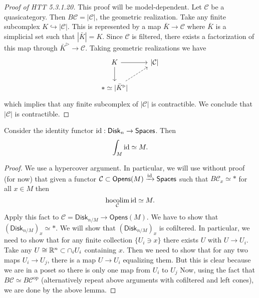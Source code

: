 \documentclass{amsart}
\DeclareMathOperator{\hocolim}{hocolim}
\newcommand{\disk}{\mathsf{Disk}_n}
\newcommand{\diskm}{\mathsf{Disk}_{n/M}}
\begin{document}
\begin{proof}[Proof of HTT 5.3.1.20]
    This proof will be model-dependent. Let $\mathcal{C}$ be a quasicategory. Then
    $B\mathcal{C}=|\mathcal{C}|$, the geometric realization.
    Take any finite subcomplex $K\hookrightarrow |\mathcal{C}|$.
    This is represented by a map $\bar K\to \mathcal{C}$ where $\bar K$
    is a simplicial set such that $|\bar K|=K$. Since $\mathcal{C}$ is filtered,
    there exists a factorization of this map through $\bar K^\triangleright\to \mathcal{C}$.
    Taking geometric realizations we have
    \begin{equation*}
        \begin{tikzcd}
            K \rar\dar & \lvert\mathcal{C}\rvert \\
            *\simeq |\bar K^\triangleright| \ar[ur,dashed]
        \end{tikzcd}
    \end{equation*}
    which implies that any finite subcomplex of $|\mathcal{C}|$ is contractible.
    We conclude that $|\mathcal{C}|$ is contractible.
\end{proof}

\begin{theorem}
    Consider the identity functor $\id:\disk \to \mathsf{Spaces}$. Then
    \begin{equation*}
        \int_M \operatorname{id} \simeq M.
    \end{equation*}
\end{theorem}
\begin{proof}
    We use a hypercover argument. In particular, we will use without proof (for now)
    that given a functor $\mathcal{C}\subset \mathsf{Opens}(M)\xrightarrow{\operatorname{id}}\mathsf{Spaces}$
    such that $B\mathcal{C}_x\simeq *$ for all $x\in M$ then
    \begin{equation*}
        \hocolim_\mathcal{C} \id \simeq M.
    \end{equation*}
    Apply this fact to $\mathcal{C}=\diskm\to \mathsf{Opens}(M)$. We have to show
    that $(\diskm)_x\simeq *$. We will show that $(\diskm)_x$ is cofiltered.
    In particular, we need to show that for any finite collection $\{U_i\ni x\}$
    there exists $U$ with $U\to U_i$.
    Take any $U\cong\mathbb{R}^n\subset\cap_i U_i$ containing $x$. Then we need to show that
    for any two maps $U_i\to U_j$, there is a map $U\to U_i$ equalizing them. But this
    is clear because we are in a poset so there is only one map from $U_i$ to $U_j$
    Now, using the fact that $B\mathcal{C}\simeq B\mathcal{C}^\text{op}$ (alternatively
    repeat above arguments with cofiltered and left cones), we are done by the above lemma.
\end{proof}
\end{document}
